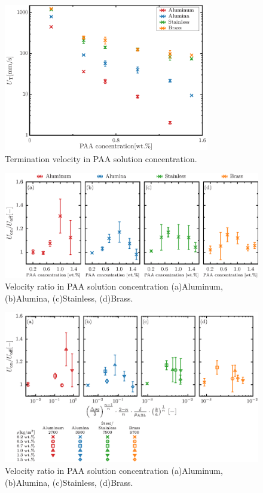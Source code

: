\begin{figure}[ht]
    \centering
    \includegraphics[width=0.8\textwidth]{./5-Results/concentrationUT.eps}
    \caption{Termination velocity in PAA solution concentration.}
    \label{fig:concentrationUT}
\end{figure}

\begin{figure}[ht]
    \centering
    \includegraphics[width=1.0\textwidth]{./5-Results/concentrationUdiff.eps}
    \caption{Velocity ratio in PAA solution concentration (a)Aluminum, (b)Alumina, (c)Stainless, (d)Brass.}
    \label{fig:concentrationUdiff}
\end{figure}

\begin{figure}[ht]
    \centering
    \includegraphics[width=1.0\textwidth]{./5-Results/concentrationUdiff_each.eps}
    \caption{Velocity ratio in PAA solution concentration (a)Aluminum, (b)Alumina, (c)Stainless, (d)Brass.}
    \label{fig:concentrationUdiff2}
\end{figure}

